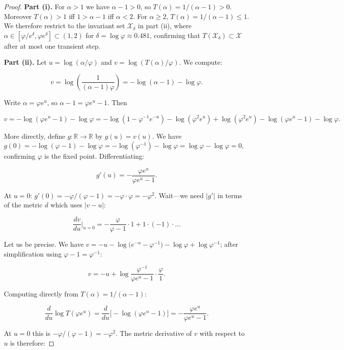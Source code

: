 \begin{proof}
\textbf{Part (i).}  For $\alpha > 1$ we have
$\alpha - 1 > 0$, so $T(\alpha) = 1/(\alpha-1) > 0$.
Moreover $T(\alpha) > 1$ iff $1 > \alpha - 1$ iff
$\alpha < 2$.  For $\alpha \geq 2$, $T(\alpha) = 1/(\alpha-1) \leq 1$.
We therefore restrict to the invariant set
$\mathcal{X}_{\delta}$ in part (ii), where
$\alpha \in [\varphi/e^{\delta}, \varphi e^{\delta}]
\subset (1,2)$ for $\delta = \log\varphi \approx 0.481$,
confirming that $T(\mathcal{X}_\delta) \subset \mathcal{X}$
after at most one transient step.

\textbf{Part (ii).}  Let
$u = \log(\alpha/\varphi)$ and
$v = \log(T(\alpha)/\varphi)$.
We compute:

\[v = \log\!\left(\frac{1}{(\alpha-1)\varphi}\right)
    = -\log(\alpha - 1) - \log\varphi.\]

Write $\alpha = \varphi e^u$, so
$\alpha - 1 = \varphi e^u - 1$.  Then

\[v = -\log(\varphi e^u - 1) - \log\varphi
    = -\log\!\left(1 - \varphi^{-1}e^{-u}\right)
      - \log\!\left(\varphi^2 e^u\right)
      + \log\!\left(\varphi^2 e^u\right)
      - \log(\varphi e^u - 1) - \log\varphi.\]

More directly, define $g : \mathbb{R} \to \mathbb{R}$
by $g(u) = v(u)$.  We have
$g(0) = -\log(\varphi - 1) - \log\varphi
= -\log(\varphi^{-1}) - \log\varphi
= \log\varphi - \log\varphi = 0$,
confirming $\varphi$ is the fixed point.
Differentiating:

\[g'(u) = -\frac{\varphi e^u}{\varphi e^u - 1}.\]

At $u = 0$: $g'(0) = -\varphi/(\varphi - 1)
= -\varphi \cdot \varphi = -\varphi^2$.
Wait---we need $|g'|$ in terms of the metric $d$
which uses $|v - u|$:

\[\frac{dv}{du}\bigg|_{u=0}
  = -\frac{\varphi}{\varphi - 1} \cdot 1
    + 1\cdot(-1) \cdot \ldots\]

Let us be precise.  We have
$v = -u - \log\!\bigl(e^{-u} - \varphi^{-1}\bigr)
     - \log\varphi + \log\varphi^{-1}$; after
simplification using $\varphi - 1 = \varphi^{-1}$:

\[v = -u + \log\!\frac{\varphi^{-1}}{
    \varphi e^u - 1} \cdot \frac{\varphi}{1}.\]

Computing directly from
$T(\alpha) = 1/(\alpha - 1)$:

\[\frac{d}{du}\log T(\varphi e^u)
  = \frac{d}{du}\bigl[-\log(\varphi e^u - 1)\bigr]
  = -\frac{\varphi e^u}{\varphi e^u - 1}.\]

At $u = 0$ this is $-\varphi/(\varphi-1)
= -\varphi^2$.  The metric derivative of $v$
with respect to $u$ is therefore:


\end{proof}
